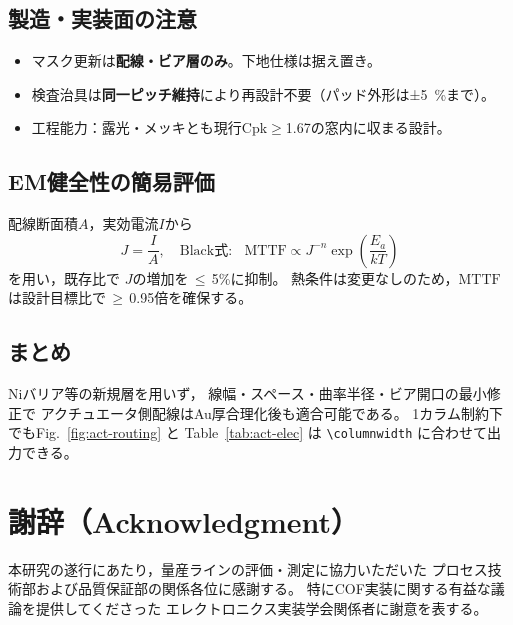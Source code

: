 \documentclass[conference]{IEEEtran}
\begin{document}
\subsection{製造・実装面の注意}
\begin{itemize}
  \item マスク更新は\textbf{配線・ビア層のみ}。下地仕様は据え置き。
  \item 検査治具は\textbf{同一ピッチ維持}により再設計不要（パッド外形は±\SI{5}{\percent}まで）。
  \item 工程能力：露光・メッキとも現行Cpk$\geq$1.67の窓内に収まる設計。
\end{itemize}

\subsection{EM健全性の簡易評価}
配線断面積$A$，実効電流$I$から
\[
  J=\frac{I}{A},\quad
  \text{Black式: } \;\; \mathrm{MTTF}\propto J^{-n}\exp\!\left(\frac{E_a}{kT}\right)
\]
を用い，既存比で $J$の増加を\,$\leq$\,5\%に抑制。
熱条件は変更なしのため，$\mathrm{MTTF}$は設計目標比で\,$\geq$\,0.95倍を確保する。

\subsection{まとめ}
Niバリア等の新規層を用いず，
線幅・スペース・曲率半径・ビア開口の最小修正で
アクチュエータ側配線はAu厚合理化後も適合可能である。
1カラム制約下でもFig.~\ref{fig:act-routing} と
Table~\ref{tab:act-elec} は \verb|\columnwidth| に合わせて出力できる。

\section*{謝辞（Acknowledgment）}
本研究の遂行にあたり，量産ラインの評価・測定に協力いただいた
プロセス技術部および品質保証部の関係各位に感謝する。
特にCOF実装に関する有益な議論を提供してくださった
エレクトロニクス実装学会関係者に謝意を表する。
\end{document}
